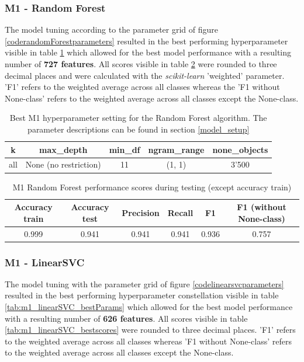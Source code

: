 \subsubsection{M1 - Random Forest}
The model tuning according to the parameter grid of figure \ref{coderandomForestparameters} resulted in the best performing hyperparameter visible in table \ref{tab:m1_randomForest_bestParams} which allowed for the best model performance with a resulting number of \textbf{727 features}. All scores visible in table \ref{tab:m1_randomForest_bestscores} were rounded to three decimal places and were calculated with the \textit{scikit-learn} 'weighted' parameter. 'F1' refers to the weighted average across all classes whereas the 'F1 without None-class' refers to the weighted average across all classes except the None-class.

\begin{table}[!htb] %
\begin{center}
\caption{Best M1 hyperparameter setting for the Random Forest algorithm. The parameter descriptions can be found in section \ref{model_setup}}\vspace{1ex}
\label{tab:m1_randomForest_bestParams}
\begin{tabular}{ccccc}\hline
k & max\_depth & min\_df & ngram\_range & none\_objects \\ \hline
all & None (no restriction) & 11 & (1, 1) & 3'500 \\ \hline
\end{tabular}
\end{center}
\end{table}

\begin{table}[!htb] %
\begin{center}
\caption{M1 Random Forest performance scores during testing (except accuracy train)}\vspace{1ex}
\label{tab:m1_randomForest_bestscores}
\begin{tabular}{cccccc}\hline
Accuracy train & Accuracy test & Precision & Recall & F1 & F1 (without None-class)\\ \hline
0.999 & 0.941 & 0.941 & 0.941 & 0.936 & 0.757 \\ \hline
\end{tabular}
\end{center}
\end{table}

\subsubsection{M1 - LinearSVC}
The model tuning with the parameter grid of figure \ref{codelinearsvcparameters} resulted in the best performing hyperparameter constellation visible in table \ref{tab:m1_linearSVC_bestParams} which allowed for the best model performance with a resulting number of \textbf{626 features}. All scores visible in table \ref{tab:m1_linearSVC_bestscores} were rounded to three decimal places. 'F1' refers to the weighted average across all classes whereas 'F1 without None-class' refers to the weighted average across all classes except the None-class.

